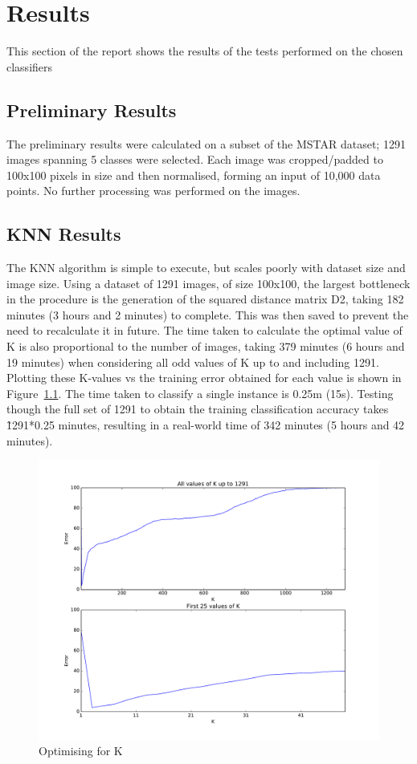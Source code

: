 \chapter{Results}
This section of the report shows the results of the tests performed on the chosen classifiers

\section{Preliminary Results}
The preliminary results were calculated on a subset of the MSTAR dataset; 1291 images spanning 5 classes were selected. Each image was cropped/padded to 100x100 pixels in size and then normalised, forming an input of 10,000 data points. No further processing was performed on the images.

\section{KNN Results}
The KNN algorithm is simple to execute, but scales poorly with dataset size and image size. Using a dataset of 1291 images, of size 100x100, the largest bottleneck in the procedure is the generation of the squared distance matrix D2, taking 182 minutes (3 hours and 2 minutes) to complete. This was then saved to prevent the need to recalculate it in future. The time taken to calculate the optimal value of K is also proportional to the number of images, taking 379 minutes (6 hours and 19 minutes) when considering all odd values of K up to and including 1291. Plotting these K-values vs the training error obtained for each value is shown in Figure~\ref{fig:k_values}. The time taken to classify a single instance is 0.25m (15s). Testing though the full set of 1291 to obtain the training classification accuracy takes \~1291*0.25 minutes, resulting in a real-world time of 342 minutes (5 hours and 42 minutes). 

\begin{figure}
	\centering
	\includegraphics[width=\textwidth]{figures/k_values1291}
	\caption{Optimising for K}
	\label{fig:k_values}
	\centering
\end{figure}



